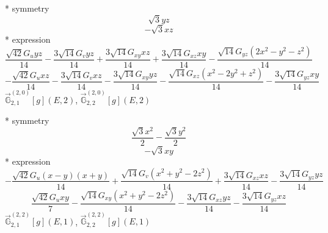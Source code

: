 \documentclass[fleqn,8pt]{jsarticle}
\begin{document}
\noindent\quad ** symmetry
\begin{dmath*}
\sqrt{3} y z
\end{dmath*}
\begin{dmath*}
- \sqrt{3} x z
\end{dmath*}
\noindent\quad ** expression
\begin{dmath*}
\frac{\sqrt{42} G_{u} y z}{14} - \frac{3 \sqrt{14} G_{v} y z}{14} + \frac{3 \sqrt{14} G_{xy} x z}{14} + \frac{3 \sqrt{14} G_{xz} x y}{14} - \frac{\sqrt{14} G_{yz} \left(2 x^{2} - y^{2} - z^{2}\right)}{14}
\end{dmath*}
\begin{dmath*}
- \frac{\sqrt{42} G_{u} x z}{14} - \frac{3 \sqrt{14} G_{v} x z}{14} - \frac{3 \sqrt{14} G_{xy} y z}{14} - \frac{\sqrt{14} G_{xz} \left(x^{2} - 2 y^{2} + z^{2}\right)}{14} - \frac{3 \sqrt{14} G_{yz} x y}{14}
\end{dmath*}
\noindent\quad $\vec{\mathbb{G}}_{2,1}^{(2,0)}[g](E,2)$, $\vec{\mathbb{G}}_{2,2}^{(2,0)}[g](E,2)$

\noindent\quad ** symmetry
\begin{dmath*}
\frac{\sqrt{3} x^{2}}{2} - \frac{\sqrt{3} y^{2}}{2}
\end{dmath*}
\begin{dmath*}
- \sqrt{3} x y
\end{dmath*}
\noindent\quad ** expression
\begin{dmath*}
- \frac{\sqrt{42} G_{u} \left(x - y\right) \left(x + y\right)}{14} + \frac{\sqrt{14} G_{v} \left(x^{2} + y^{2} - 2 z^{2}\right)}{14} + \frac{3 \sqrt{14} G_{xz} x z}{14} - \frac{3 \sqrt{14} G_{yz} y z}{14}
\end{dmath*}
\begin{dmath*}
\frac{\sqrt{42} G_{u} x y}{7} - \frac{\sqrt{14} G_{xy} \left(x^{2} + y^{2} - 2 z^{2}\right)}{14} - \frac{3 \sqrt{14} G_{xz} y z}{14} - \frac{3 \sqrt{14} G_{yz} x z}{14}
\end{dmath*}
\noindent\quad $\vec{\mathbb{G}}_{2,1}^{(2,2)}[g](E,1)$, $\vec{\mathbb{G}}_{2,2}^{(2,2)}[g](E,1)$
\end{document}
